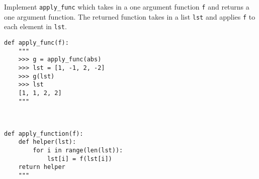 \begin{blocksection}
\question Implement \lstinline$apply_func$ which takes in a one argument function \lstinline$f$ 
and returns a one argument function. The returned function takes in a list \lstinline$lst$ and applies 
\lstinline$f$ to each element in \lstinline$lst$.

\begin{lstlisting}
def apply_func(f):
    """
    >>> g = apply_func(abs)
    >>> lst = [1, -1, 2, -2]
    >>> g(lst)
    >>> lst
    [1, 1, 2, 2]
    """



\end{lstlisting}

\begin{solution}[1.5in]
\begin{lstlisting}
def apply_function(f):
    def helper(lst):
        for i in range(len(lst)):
            lst[i] = f(lst[i])
    return helper
    """
\end{lstlisting}
\end{solution}
\end{blocksection}